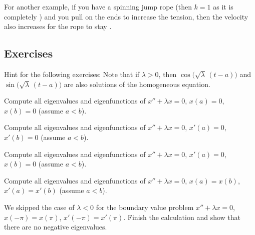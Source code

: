\begin{myfig}
\capstart
{}
\caption{Whirling string at the third eigenvalue ($k=3$).\label{bvp:whirstring2fig}}
\end{myfig}

For another example, if you have a spinning jump rope (then $k=1$ as it is
completely ) and you
pull on the ends to increase the tension, then the velocity also increases
for the rope to stay .


\subsection{Exercises}

Hint for the following exercises:  Note that
if $\lambda > 0$, then
$\cos \bigl( \sqrt{\lambda}\, (t - a) \bigr)$
and $\sin  \bigl( \sqrt{\lambda}\, (t - a) \bigr)$
are also solutions of the homogeneous
equation.

\begin{exercise}
Compute all
eigenvalues and eigenfunctions of
$x'' + \lambda x = 0$, $x(a) = 0$, $x(b) = 0$ (assume $a < b$).
\end{exercise}

\begin{exercise}
Compute all
eigenvalues and eigenfunctions of
$x'' + \lambda x = 0$, $x'(a) = 0$, $x'(b) = 0$ (assume $a < b$).
\end{exercise}

\begin{exercise}
Compute all
eigenvalues and eigenfunctions of
$x'' + \lambda x = 0$, $x'(a) = 0$, $x(b) = 0$ (assume $a < b$).
\end{exercise}

\begin{exercise}
Compute all 
eigenvalues and eigenfunctions of
$x'' + \lambda x = 0$, $x(a) = x(b)$, $x'(a) = x'(b)$ (assume $a < b$).
\end{exercise}

\begin{exercise}
We skipped the case of $\lambda < 0$ for
the boundary value problem
$x'' + \lambda x = 0$, $x(-\pi) = x(\pi)$, $x'(-\pi) = x'(\pi)$.
Finish the calculation and show that there are no negative eigenvalues.
\end{exercise}

